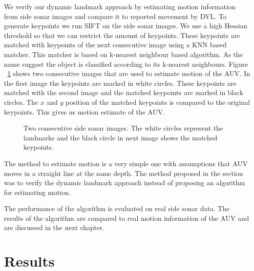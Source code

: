 \documentclass[12pt]{dalcsthesis}
\begin{document}
We verify our dynamic landmark approach by estimating motion information from side sonar images and compare it to reported movement by DVL. To generate keypoints we run SIFT on the side sonar images. We use a high Hessian threshold so that we can restrict the amount of keypoints. These keypoints are matched with keypoints of the next consecutive image using a KNN based matcher. This matcher is based on k-nearest neighbour based algorithm. As the name suggest the object is classified according to its k-nearest neighbours.  Figure ~\ref{fig- matched images} shows two consecutive images that are used to estimate motion of the AUV. In the first image the keypoints are marked in white circles. These keypoints are matched with the second image and the matched keypoints are marked in black circles. The $x$ and $y$ position of the matched keypoints is compared to the original keypoints. This gives us motion estimate of the AUV. 

\begin{figure}
  \centering
  \qquad
  \qquad
 \caption{\label{fig- matched images}Two consecutive side sonar images. The white circles represent the landmarks and the black circle in next image shows the matched keypoints.}
\end{figure}

The method to estimate motion is a very simple one with assumptions that AUV moves in a straight line at the same depth. The method proposed in the section was to verify the dynamic landmark approach instead of proposing an algorithm for estimating motion. 

The performance of the algorithm is evaluated on real side sonar data. The results of the algorithm are compared to real motion information of the AUV and are discussed in the next chapter. 

\chapter{Results}
\label{ch-: results motion estimation}
\end{document}
